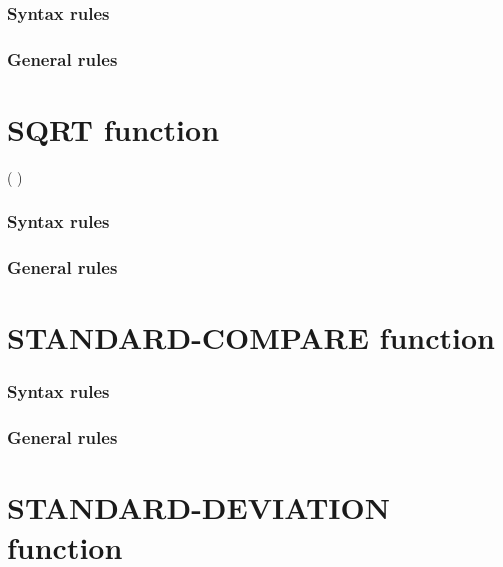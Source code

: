 \subsubsection{Syntax rules}

\subsubsection{General rules}

\section{SQRT function}

\begin{syntax}
    ( \argument )
\end{syntax}

\subsubsection{Syntax rules}

\subsubsection{General rules}

\section{STANDARD-COMPARE function}

\begin{syntax}

  \pending{
    ( \argument \argument
    \begin{0-1}
      \argument
    \end{0-1}
    \begin{0-1}
      \argument
    \end{0-1}
    )
  }
\end{syntax}

\subsubsection{Syntax rules}

\subsubsection{General rules}

\section{STANDARD-DEVIATION function}


